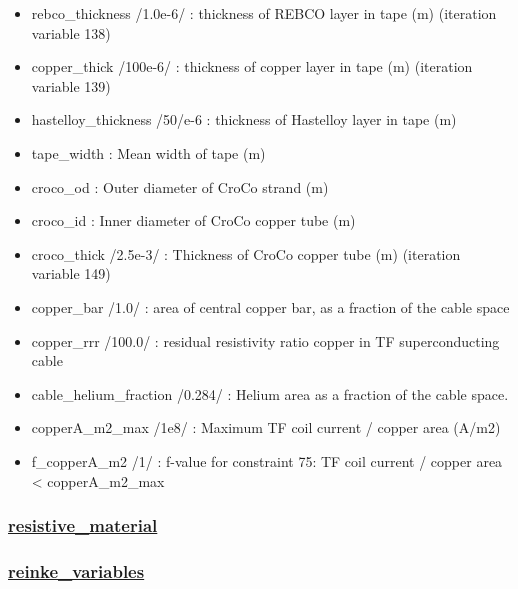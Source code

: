 \documentclass[]{article}
\providecommand{\tightlist}{%
  \setlength{\itemsep}{0pt}\setlength{\parskip}{0pt}}
\begin{document}
\begin{itemize}
\tightlist
\item
  rebco\_thickness /1.0e-6/ : thickness of REBCO layer in tape (m)
  (iteration variable 138)
\item
  copper\_thick /100e-6/ : thickness of copper layer in tape (m)
  (iteration variable 139)
\item
  hastelloy\_thickness /50/e-6 : thickness of Hastelloy layer in tape
  (m)
\item
  tape\_width : Mean width of tape (m)
\item
  croco\_od : Outer diameter of CroCo strand (m)
\item
  croco\_id : Inner diameter of CroCo copper tube (m)
\item
  croco\_thick /2.5e-3/ : Thickness of CroCo copper tube (m) (iteration
  variable 149)
\item
  copper\_bar /1.0/ : area of central copper bar, as a fraction of the
  cable space
\item
  copper\_rrr /100.0/ : residual resistivity ratio copper in TF
  superconducting cable
\item
  cable\_helium\_fraction /0.284/ : Helium area as a fraction of the
  cable space.
\item
  copperA\_m2\_max /1e8/ : Maximum TF coil current / copper area (A/m2)
\item
  f\_copperA\_m2 /1/ : f-value for constraint 75: TF coil current /
  copper area \textless{} copperA\_m2\_max
\end{itemize}

\hypertarget{resistive_material}{%
\subsubsection{\texorpdfstring{\href{resistive_material.html}{resistive\_material}}{resistive\_material}}\label{resistive_material}}

\hypertarget{reinke_variables}{%
\subsubsection{\texorpdfstring{\href{reinke_variables.html}{reinke\_variables}}{reinke\_variables}}\label{reinke_variables}}
\end{document}
